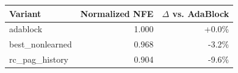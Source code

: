 \begin{tabular}{lrr}
\toprule
Variant & Normalized NFE & $\Delta$ vs. AdaBlock \\
\midrule
adablock & 1.000 & +0.0\% \\ 
best\_nonlearned & 0.968 & -3.2\% \\ 
rc\_pag\_history & 0.904 & -9.6\% \\ 
\bottomrule
\end{tabular}
